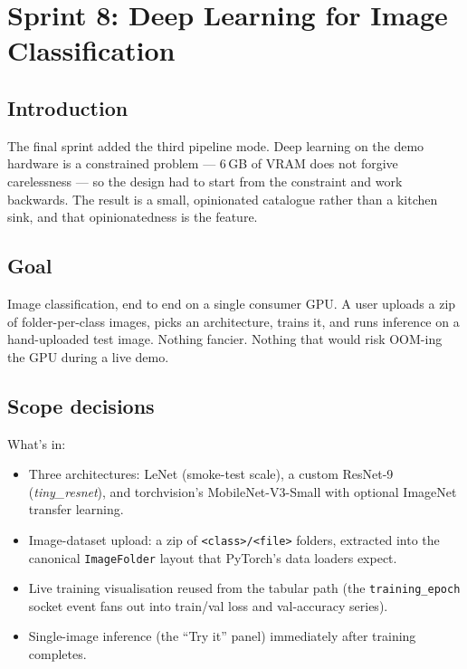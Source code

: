 \documentclass[12pt, a4paper]{report}
\begin{document}
\chapter{Sprint 8: Deep Learning for Image Classification}

\section*{Introduction}

The final sprint added the third pipeline mode. Deep learning on the
demo hardware is a constrained problem --- 6\,GB of VRAM does not
forgive carelessness --- so the design had to start from the
constraint and work backwards. The result is a small, opinionated
catalogue rather than a kitchen sink, and that opinionatedness is the
feature.

\section{Goal}

Image classification, end to end on a single consumer GPU. A user
uploads a zip of folder-per-class images, picks an architecture,
trains it, and runs inference on a hand-uploaded test image. Nothing
fancier. Nothing that would risk OOM-ing the GPU during a live demo.

\section{Scope decisions}

What's in:

\begin{itemize}
    \item Three architectures: LeNet (smoke-test scale), a custom
        ResNet-9 (\textit{tiny\_resnet}), and torchvision's
        MobileNet-V3-Small with optional ImageNet transfer learning.
    \item Image-dataset upload: a zip of \texttt{<class>/<file>}
        folders, extracted into the canonical \texttt{ImageFolder}
        layout that PyTorch's data loaders expect.
    \item Live training visualisation reused from the tabular path
        (the \texttt{training\_epoch} socket event fans out into
        train/val loss and val-accuracy series).
    \item Single-image inference (the ``Try it'' panel) immediately
        after training completes.
\end{itemize}
\end{document}
